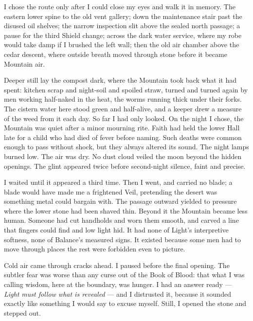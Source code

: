 I chose the route only after I could close my eyes and walk it in memory. The eastern lower spine to the old vent gallery; down the maintenance stair past the disused oil shelves; the narrow inspection slit above the sealed north passage; a pause for the third Shield change; across the dark water service, where my robe would take damp if I brushed the left wall; then the old air chamber above the cedar descent, where outside breath moved through stone before it became Mountain air.\par

Deeper still lay the compost dark, where the Mountain took back what it had spent: kitchen scrap and night-soil and spoiled straw, turned and turned again by men working half-naked in the heat, the worms running thick under their forks. The cistern water here stood green and half-alive, and a keeper drew a measure of the weed from it each day.
So far I had only looked. On the night I chose, the Mountain was quiet after a minor mourning rite. Faith had held the lower Hall late for a child who had died of fever before naming. Such deaths were common enough to pass without shock, but they always altered its sound. The night lamps burned low. The air was dry. No dust cloud veiled the moon beyond the hidden openings. The glint appeared twice before second-night silence, faint and precise.\par

I waited until it appeared a third time. Then I went, and carried no blade; a blade would have made me a frightened Veil, pretending the desert was something metal could bargain with. The passage outward yielded to pressure where the lower stone had been shaved thin. Beyond it the Mountain became less human. Someone had cut handholds and worn them smooth, and carved a line that fingers could find and low light hid. It had none of Light's interpretive softness, none of Balance's measured signs. It existed because some men had to move through places the rest were forbidden even to picture.\par

Cold air came through cracks ahead. I paused before the final opening. The subtler fear was worse than any curse out of the Book of Blood: that what I was calling wisdom, here at the boundary, was hunger. I had an answer ready --- \textit{Light must follow what is revealed} --- and I distrusted it, because it sounded exactly like something I would say to excuse myself. Still, I opened the stone and stepped out.\par

